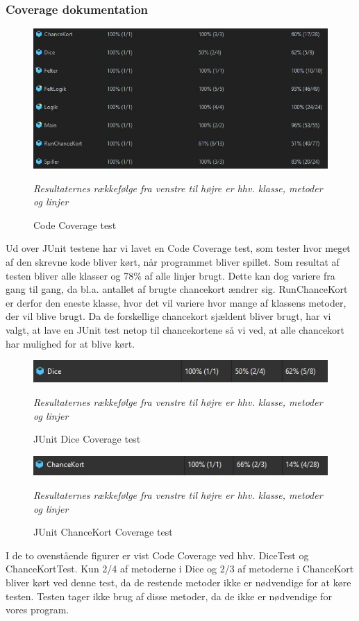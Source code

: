 \subsubsection{Coverage dokumentation}
\begin{figure}[H]
        \centering
        \includegraphics[width=15cm]{figures/codeCoverage.JPG}
        \caption{Code Coverage test}
        \emph{Resultaternes rækkefølge fra venstre til højre er hhv. klasse, metoder og linjer}
    \end{figure}
    Ud over JUnit testene har vi lavet en Code Coverage test, som tester hvor meget af den skrevne kode bliver kørt, når programmet bliver spillet.
    Som resultat af testen bliver alle klasser og 78\% af alle linjer brugt. Dette kan dog variere fra gang til gang, da bl.a. antallet af brugte chancekort ændrer sig. RunChanceKort er derfor den eneste klasse, hvor det vil variere hvor mange af klassens metoder, der vil blive brugt. Da de forskellige chancekort sjældent bliver brugt, har vi valgt, at lave en JUnit test netop til chancekortene så vi ved, at alle chancekort har mulighed for at blive kørt.
    
    \begin{figure}[H]
        \centering
        \includegraphics[width=12cm]{figures/diceCoverage.JPG}
        \caption{JUnit Dice Coverage test}
        \emph{Resultaternes rækkefølge fra venstre til højre er hhv. klasse, metoder og linjer}
    \end{figure}
    
    \begin{figure}[H]
        \centering
        \includegraphics[width=12cm]{figures/chanceCoverage.JPG}
        \caption{JUnit ChanceKort Coverage test}
        \emph{Resultaternes rækkefølge fra venstre til højre er hhv. klasse, metoder og linjer}
    \end{figure}

I de to ovenstående figurer er vist Code Coverage ved hhv. DiceTest og ChanceKortTest. Kun 2/4 af metoderne i Dice og 2/3 af metoderne i ChanceKort bliver kørt ved denne test, da de restende metoder ikke er nødvendige for at køre testen. Testen tager ikke brug af disse metoder, da de ikke er nødvendige for vores program.

